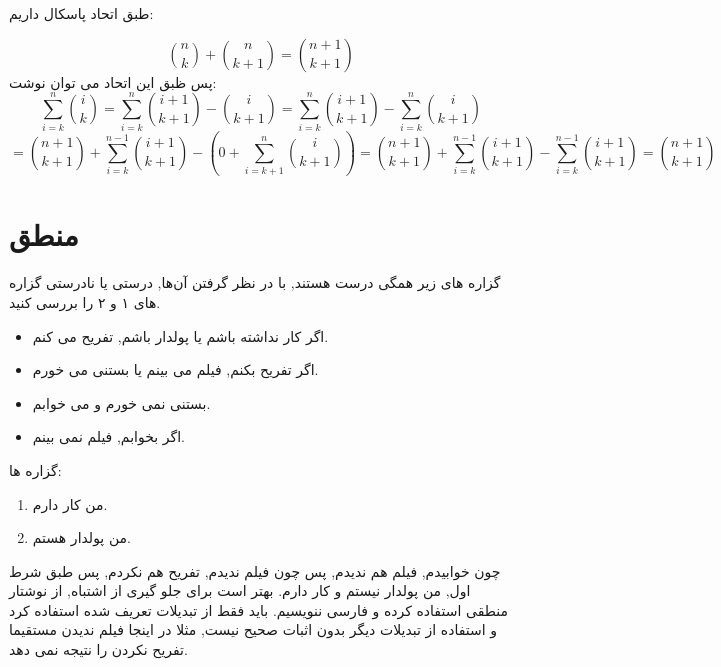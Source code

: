 \documentclass[11pt,largemargins]{h2wp}
\begin{document}
 
 
 
 طبق اتحاد پاسکال داریم:

$$ \binom{n}{k}+\binom{n}{k+1}=\binom{n+1}{k+1}$$
پس ظبق این اتحاد می توان نوشت:
\[\]
\[\sum_{i=k}^{n} {\binom{i}{k}} =\sum_{i=k}^{n} {\binom{i+1}{k+1}-\binom{i}{k+1}}=\sum_{i=k}^{n} {\binom{i+1}{k+1}}-\sum_{i=k}^{n} {\binom{i}{k+1}}\]\[=\binom{n+1}{k+1}+\sum_{i=k}^{n-1} {\binom{i+1}{k+1}}-(0+\sum_{i=k+1}^{n} {\binom{i}{k+1}})=\binom{n+1}{k+1}+\sum_{i=k}^{n-1} {\binom{i+1}{k+1}}-\sum_{i=k}^{n-1} {\binom{i+1}{k+1}}=\binom{n+1}{k+1}\]



\chapter*{منطق}


\question
گزاره های زیر همگی درست هستند, با در نظر گرفتن آن‌ها, درستی یا نادرستی گزاره های ۱ و ۲ را بررسی کنید.
\begin{itemize}
\item اگر کار نداشته باشم یا پولدار باشم, تفریح می کنم.
\item اگر تفریح بکنم, فیلم می بینم یا بستنی می خورم.
\item بستنی نمی خورم و می خوابم.
\item اگر بخوابم, فیلم نمی بینم.
\end{itemize}
گزاره ها:
\begin{enumerate}
\item من کار دارم.
\item من پولدار هستم.
\end{enumerate}
\solution
چون خوابیدم, فیلم هم ندیدم, پس چون فیلم ندیدم, تفریح هم نکردم, پس طبق شرط اول, من پولدار نیستم و کار دارم.
\notes
{} بهتر است برای جلو گیری از اشتباه, از نوشتار منطقی استفاده کرده و فارسی ننویسیم.
 باید فقط از تبدیلات تعریف شده استفاده کرد و استفاده از تبدیلات دیگر بدون اثبات صحیح نیست, مثلا در اینجا فیلم ندیدن مستقیما تفریح نکردن را نتیجه نمی دهد.
 
\end{document}
